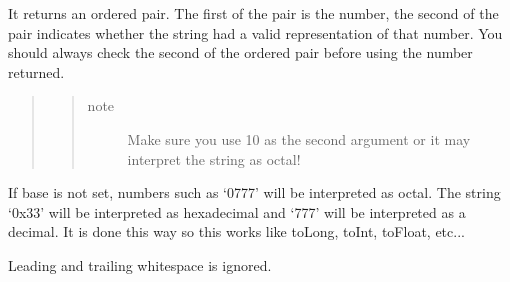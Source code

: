 \documentclass[letterpaper,10pt,english]{sphinxmanual}
\begin{document}
\begin{fulllineitems}
\begin{fulllineitems}
It returns an ordered pair.  The first of the pair is the number, the second of the pair indicates whether the string had a valid representation of that number.  You should always check the second of the ordered pair before using the number returned.
\begin{quote}
\begin{quote}\begin{description}
\item[{note}] \leavevmode
Make sure you use 10 as the second argument or it may interpret the string as octal!

\end{description}\end{quote}
\end{quote}

If base is not set, numbers such as `0777' will be interpreted as octal.  The string `0x33' will
be interpreted as hexadecimal and `777' will be interpreted as a decimal.  It is done this way
so this works like toLong, toInt, toFloat, etc...

Leading and trailing whitespace is ignored.

\end{fulllineitems}


\end{fulllineitems}

\end{document}
